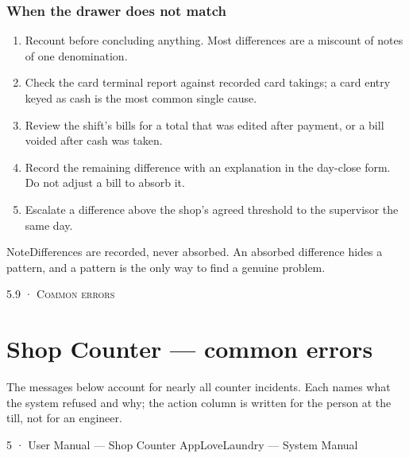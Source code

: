 \documentclass[11pt,a4paper,oneside]{book}
\begin{document}
\subsubsection*{When the drawer does not match}
\begin{enumerate}
\item Recount before concluding anything. Most differences are a miscount of notes of one denomination.
\item Check the card terminal report against recorded card takings; a card entry keyed as cash is the most common single cause.
\item Review the shift's bills for a total that was edited after payment, or a bill voided after cash was taken.
\item Record the remaining difference with an explanation in the day-close form. Do not adjust a bill to absorb it.
\item Escalate a difference above the shop's agreed threshold to the supervisor the same day.
\end{enumerate}
\begin{notebox}NoteDifferences are recorded, never absorbed. An absorbed difference hides a pattern, and a pattern is the only way to find a genuine problem.\end{notebox}
\textsc{\small\color{crimson}5.9 · Common errors}\par\medskip
\section*{Shop Counter — common errors}
The messages below account for nearly all counter incidents. Each names what the system refused and why; the action column is written for the person at the till, not for an engineer.

5 · User Manual — Shop Counter AppLoveLaundry — System Manual
\end{document}
